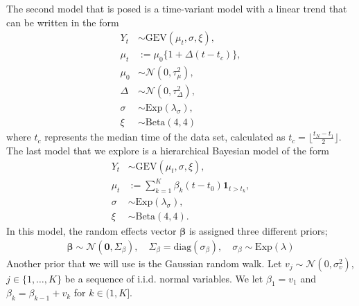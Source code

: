 \documentclass[12pt, a4paper]{article}
\begin{document}
  The second model that is posed is a time-variant model with a linear trend
  that can be written in the form 
  \begin{align*}
    Y_t &\sim \mathrm{GEV}(\mu_t, \sigma, \xi),  \\
    \mu_t &:= \mu_0 \{1 + \Delta (t - t_c)\}, \\
    \mu_0 &\sim \mathcal N(0, \tau_\mu^2), \\
    \Delta &\sim \mathcal N(0, \tau_\Delta^2), \\
    \sigma &\sim \mathrm{Exp}(\lambda_\sigma), \\
    \xi &\sim \mathrm{Beta}(4, 4)
  \end{align*}
  where \(t_c\) represents the median time of the data set, calculated as
  \(t_c = \lfloor \frac{t_N - t_1}{2} \rfloor\). The last model that we explore 
  is a hierarchical Bayesian model of the form
  \begin{align*}
    Y_t &\sim \mathrm{GEV}(\mu_t, \sigma, \xi), \\
    \mu_t &:= \sum_{k = 1}^K \beta_k (t - t_0) \mathbf 1_{t > t_k}, \\
    \sigma &\sim \mathrm{Exp}(\lambda_\sigma), \\
    \xi &\sim \mathrm{Beta}(4, 4).
  \end{align*}
  In this model, the random effects vector \(\bm \beta\) is assigned three
  different priors;
  \begin{align*}
    \bm \beta \sim \mathcal N(\bm 0, \Sigma_\beta),
    \quad \Sigma_\beta = \mathrm{diag}(\sigma_\beta), \quad
    \sigma_\beta \sim \mathrm{Exp}(\lambda)
  \end{align*}
  Another prior that we will use is the Gaussian random walk. Let
  \(v_j \sim \mathcal N(0, \sigma_v^2)\), \(j \in \{1, \ldots, K\}\) be a
  sequence of i.i.d. normal variables. We let \(\beta_1 = v_1\) and
  \(\beta_k = \beta_{k - 1} + v_k\) for \(k \in (1, K]\).
\end{document}
